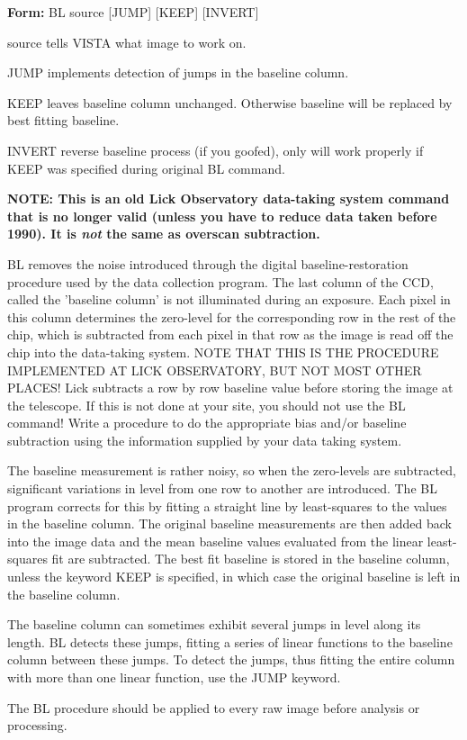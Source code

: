 \begin{command}
  \item[\textbf{Form: }BL source {[JUMP]} {[KEEP]} {[INVERT]}\hfill]{}
  \item[source]{tells VISTA what image to work on.}
  \item[JUMP]{implements detection of jumps in the baseline column.}
  \item[KEEP]{leaves baseline column unchanged. Otherwise
       baseline will be replaced by best fitting baseline.}
  \item[INVERT]{reverse baseline process (if you goofed), only
                will work properly if KEEP was specified during
                original BL command.}
\end{command}

{\bf NOTE: This is an old Lick Observatory data-taking system command
that is no longer valid (unless you have to reduce data taken before
1990).  It is {\it not} the same as overscan subtraction.}

BL removes the noise introduced through the digital baseline-restoration
procedure used by the data collection program.  The last column of the CCD,
called the 'baseline column' is not illuminated during an exposure.  Each
pixel in this column determines the zero-level for the corresponding row in
the rest of the chip, which is subtracted from each pixel in that row as
the image is read off the chip into the data-taking system.  NOTE THAT THIS
IS THE PROCEDURE IMPLEMENTED AT LICK OBSERVATORY, BUT NOT MOST OTHER
PLACES!  Lick subtracts a row by row baseline value before storing the
image at the telescope. If this is not done at your site, you should not
use the BL command!  Write a procedure to do the appropriate bias and/or
baseline subtraction using the information supplied by your data taking
system.

The baseline measurement is rather noisy, so when the zero-levels are
subtracted, significant variations in level from one row to another are
introduced.  The BL program corrects for this by fitting a straight line by
least-squares to the values in the baseline column. The original baseline
measurements are then added back into the image data and the mean baseline
values evaluated from the linear least-squares fit are subtracted.  The
best fit baseline is stored in the baseline column, unless the keyword KEEP
is specified, in which case the original baseline is left in the baseline
column.

The baseline column can sometimes exhibit several jumps in level along its
length.  BL detects these jumps, fitting a series of linear functions to
the baseline column between these jumps.  To detect the jumps, thus fitting
the entire column with more than one linear function, use the JUMP keyword.

The BL procedure should be applied to every raw image before analysis or
processing.

